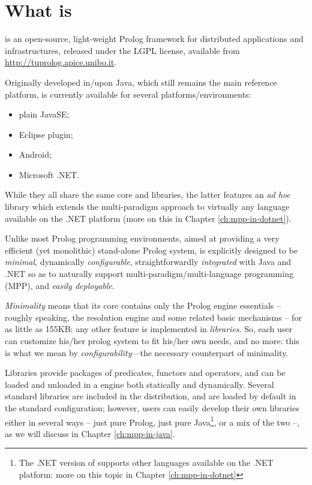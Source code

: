 \chapter{What is \tuprolog{}}
\label{what-is}

\tuprolog{} is an open-source, light-weight Prolog framework for distributed applications and infrastructures, released under the LGPL license, available from \url{http://tuprolog.apice.unibo.it}.

Originally developed in/upon Java, which still remains the main reference platform,
\tuprolog{} is currently available for several platforms/environments:
\begin{itemize}
  \item plain JavaSE;
  \item Eclipse plugin;
  \item Android;
  \item Microsoft .NET.
\end{itemize}
%
While they all share the same core and libraries, the latter features an \emph{ad hoc} library which extends the multi-paradigm approach to virtually any language available on the .NET platform (more on this in Chapter \ref{ch:mpp-in-dotnet}).

Unlike most Prolog programming environments, aimed at providing a very efficient (yet monolithic) stand-alone Prolog system, \tuprolog{} is explicitly designed to be \emph{minimal}, dynamically \emph{configurable}, straightforwardly \emph{integrated} with Java and .NET so as to naturally support multi-paradigm/multi-language programming (MPP), and \emph{easily deployable}.

\textit{Minimality} means that its core contains only the Prolog engine essentials -- roughly speaking, the resolution engine and some related basic mechanisms -- for as little as 155KB: any other feature is implemented in \textit{libraries}.
%
So, each user can customize his/her prolog system to fit his/her own needs, and no more:
this is what we mean by \tuprolog{} \textit{configurability}---the necessary counterpart of minimality.

Libraries provide packages of predicates, functors and operators, and can be loaded and unloaded in a \tuprolog{} engine both statically and dynamically.
%
Several standard libraries are included in the \tuprolog{} distribution, and are loaded by default in the standard \tuprolog{} configuration; however, users can easily develop their own libraries either in several ways -- just pure Prolog, just pure Java\footnote{The .NET version of \tuprolog{} supports other languages available on the .NET platform: more on this topic in Chapter \ref{ch:mpp-in-dotnet}}, or a mix of the two --, as we will discuss in Chapter \ref{ch:mpp-in-java}.

